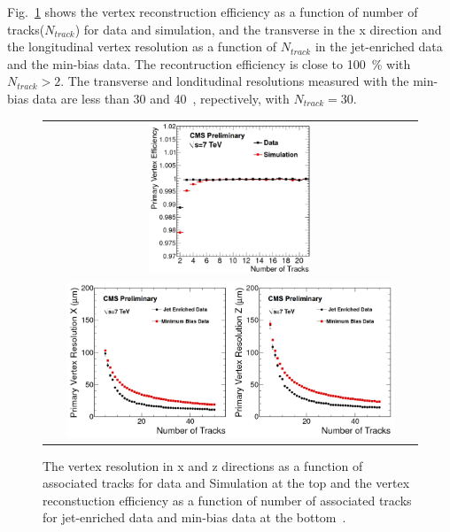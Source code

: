 Fig.~\ref{fig:VtxEff} shows the vertex reconstruction efficiency as a function 
of number of tracks($N_{track}$) for data and simulation, 
and the transverse in the x direction and the longitudinal vertex resolution 
as a function of $N_{track}$ in the jet-enriched data and the min-bias data. 
The recontruction efficiency is close to 100~\% with  
$N_{track}>2$. The transverse and londitudinal resolutions measured with 
the min-bias data are less than 30 and 40~\um, repectively, with $N_{track}=30$.

\begin{figure}[htp] 
\centering 
\begin{tabular}{c} 
\includegraphics[width=0.45\textwidth]{figures/PrimaryVertexTagAndProbeEfficiency.png} \\ 
\includegraphics[width=0.9\textwidth]{figures/PrimaryVertexResolutions.png}  
\end{tabular} 
\caption{The vertex resolution in x and z directions as a function of associated tracks
for data and Simulation at the top 
and the vertex reconstuction efficiency as a function of number of associated tracks
for jet-enriched data and min-bias data at the bottom~\cite{muonTrkPerform}. }
\label{fig:VtxEff} 
\end{figure} 

